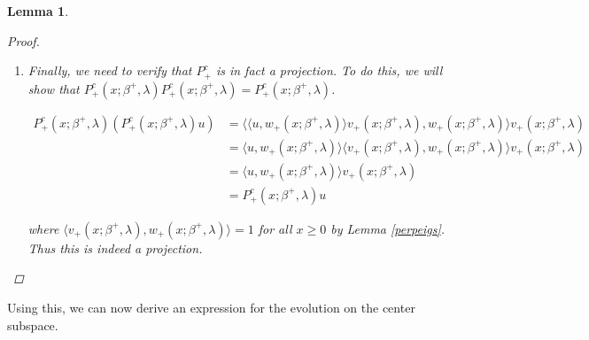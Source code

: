 \documentclass[12pt]{article}
\DeclareMathOperator{\spn}{span}
\newtheorem{lemma}{Lemma}
\begin{document}
\begin{lemma}
\begin{proof}
\begin{enumerate}
$P^c_+$ is clearly linear, and its range is $\spn\{ v_+(x; \beta^+, \lambda) \}$, which is exactly what we want. Using Lemmas \ref{perpouter} and \ref{perpinner}, 

\[
\ker P^c_+(x; \beta^+, \lambda) = R^s_+(x; \beta^+, \lambda) \oplus R^u_+(x; \beta^+, \lambda)
\]

which is also exactly what we want.

\item Finally, we need to verify that $P^c_+$ is in fact a projection. To do this, we will show that $P^c_+(x; \beta^+, \lambda)P^c_+(x; \beta^+, \lambda) = P^c_+(x; \beta^+, \lambda)$.

\begin{align*}
P^c_+(x; \beta^+, \lambda)( P^c_+(x; \beta^+, \lambda) u ) &= \langle \langle u, w_+(x; \beta^+, \lambda) \rangle v_+(x; \beta^+, \lambda), w_+(x; \beta^+, \lambda) \rangle v_+(x; \beta^+, \lambda) \\
&= \langle u, w_+(x; \beta^+, \lambda) \rangle \langle v_+(x; \beta^+, \lambda), w_+(x; \beta^+, \lambda) \rangle v_+(x; \beta^+, \lambda) \\
&= \langle u, w_+(x; \beta^+, \lambda) \rangle v_+(x; \beta^+, \lambda) \\
&= P^c_+(x; \beta^+, \lambda) u 
\end{align*}

where $\langle v_+(x; \beta^+, \lambda), w_+(x; \beta^+, \lambda) \rangle = 1$ for all $x \geq 0$ by Lemma \ref{perpeigs}. Thus this is indeed a projection.
\end{enumerate}
\end{proof}
\end{lemma}

Using this, we can now derive an expression for the evolution on the center subspace.

\end{document}

